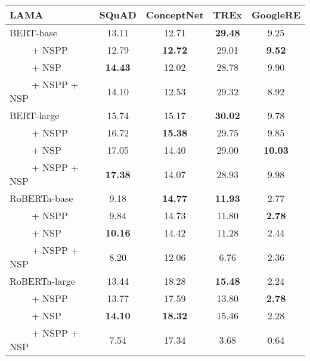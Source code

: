 \newcommand{\sig}{$^{\ast}$}
\setlength{\tabcolsep}{0.03in}
\small
\begin{tabular}{l cccc}
\toprule
LAMA& SQuAD & ConceptNet & TREx & GoogleRE \\
\midrule

{BERT-base} & 13.11 & 12.71 & \textbf{29.48} & 9.25 \\
~~~~ + NSPP & 12.79 & \textbf{12.72} & 29.01 & \textbf{9.52} \\
~~~~ + NSP & \textbf{14.43} & 12.02 & 28.78 & 9.90 \\
~~~~ + NSPP + NSP & 14.10 & 12.53 & 29.32 & 8.92 \\
\midrule
{BERT-large} &  15.74 & 15.17 & \textbf{30.02} & 9.78 \\
~~~~ + NSPP & 16.72 & \textbf{15.38} & 29.75 & 9.85 \\
~~~~ + NSP & 17.05 & 14.40 & 29.00 & \textbf{10.03} \\
~~~~ + NSPP + NSP & \textbf{17.38} & 14.07 & 28.93 & 9.98 \\

\midrule
\midrule
{RoBERTa-base} & 9.18 & \textbf{14.77} & \textbf{11.93} & 2.77 \\
~~~~ + NSPP & 9.84 & 14.73 & 11.80 & \textbf{2.78} \\
~~~~ + NSP & \textbf{10.16} & 14.42 & 11.28 & 2.44 \\
~~~~ + NSPP + NSP & 8.20 & 12.06 & 6.76 & 2.36 \\
\midrule
{RoBERTa-large} & 13.44 & 18.28 & \textbf{15.48} & 2.24 \\
~~~~ + NSPP & 13.77 & 17.59 & 13.80 & \textbf{2.78} \\
~~~~ + NSP & \textbf{14.10} & \textbf{18.32} & 15.46 & 2.28 \\
~~~~ + NSPP + NSP & 7.54 & 17.34 & 3.68 & 0.64 \\
\bottomrule
\end{tabular}
